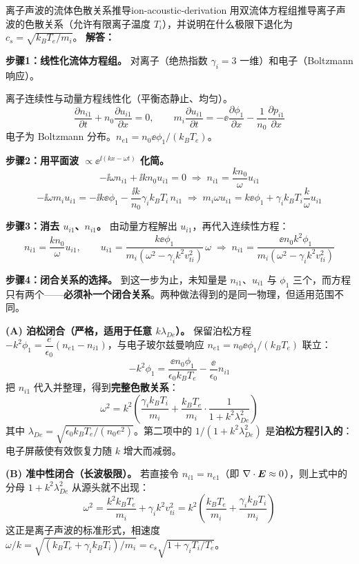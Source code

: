 \begin{example}{离子声波的流体色散关系推导}{ion-acoustic-derivation}
用双流体方程组推导离子声波的色散关系（允许有限离子温度 $T_i$），并说明在什么极限下退化为 $c_s = \sqrt{k_{\!B}T_e/m_i}$。
\tcblower
\textbf{解答：}

\textbf{步骤1：线性化流体方程组。} 对离子（绝热指数 $\gamma_i = 3$ 一维）和电子（Boltzmann 响应）。

离子连续性与动量方程线性化（平衡态静止、均匀）。
\[
\frac{\partial n_{i1}}{\partial t} + n_0\frac{\partial u_{i1}}{\partial x} = 0, \qquad
m_i\frac{\partial u_{i1}}{\partial t} = -\ee\frac{\partial\phi_1}{\partial x} - \frac{1}{n_0}\frac{\partial p_{i1}}{\partial x}
\]
电子为 Boltzmann 分布。$n_{e1} = n_0\ee\phi_1/(k_{\!B}T_e)$。

\textbf{步骤2：用平面波 $\propto\ee^{\ii(kx-\omega t)}$ 化简。}
\[
-\ii\omega n_{i1} + \ii k n_0 u_{i1} = 0 \;\Rightarrow\; n_{i1} = \frac{k n_0}{\omega}u_{i1}
\]
\[
-\ii\omega m_i u_{i1} = -\ii k \ee\phi_1 - \frac{\ii k}{n_0}\gamma_i k_{\!B}T_i\, n_{i1}
\;\Rightarrow\; m_i\omega u_{i1} = k\ee\phi_1 + \gamma_i k_{\!B}T_i\frac{k}{\omega}u_{i1}
\]

\textbf{步骤3：消去 $u_{i1}$、$n_{i1}$。} 由动量方程解出 $u_{i1}$，再代入连续性方程：
\[
n_{i1} = \frac{k n_0}{\omega}u_{i1}, \qquad
u_{i1} = \frac{k\ee\phi_1}{m_i(\omega^2 - \gamma_i k^2 v_{ti}^2)}\,\omega
\;\Longrightarrow\;
n_{i1} = \frac{\ee n_0 k^2\phi_1}{m_i(\omega^2 - \gamma_i k^2 v_{ti}^2)}
\]

\textbf{步骤4：闭合关系的选择。} 到这一步为止，未知量是 $n_{i1}$、$u_{i1}$ 与 $\phi_1$ 三个，而方程只有两个——\textbf{必须补一个闭合关系}。两种做法得到的是同一物理，但适用范围不同。

\smallskip
\textbf{(A) 泊松闭合（严格，适用于任意 $k\lambda_{De}$）。} 保留泊松方程 $-k^2\phi_1 = \dfrac{e}{\epsilon_0}(n_{e1}-n_{i1})$，与电子玻尔兹曼响应 $n_{e1}=n_0\ee\phi_1/(k_{\!B}T_e)$ 联立：
\[
-k^2\phi_1 = \frac{\ee n_0\phi_1}{\epsilon_0 k_{\!B}T_e} - \frac{\ee}{\epsilon_0}n_{i1}
\]
把 $n_{i1}$ 代入并整理，得到\textbf{完整色散关系}：
\[
\boxed{\;\omega^2 = k^2\left(\frac{\gamma_i k_{\!B}T_i}{m_i} + \frac{k_{\!B}T_e}{m_i}\cdot\frac{1}{1+k^2\lambda_{De}^2}\right)\;}
\]
其中 $\lambda_{De}=\sqrt{\epsilon_0 k_{\!B}T_e/(n_0e^2)}$。第二项中的 $1/(1+k^2\lambda_{De}^2)$ 是\textbf{泊松方程引入的}：电子屏蔽使有效恢复力随 $k$ 增大而减弱。

\smallskip
\textbf{(B) 准中性闭合（长波极限）。} 若直接令 $n_{i1}=n_{e1}$（即 $\nabla\cdot\bm{E}\approx0$），则上式中的分母 $1+k^2\lambda_{De}^2$ 从源头就不出现：
\[
\omega^2 = \frac{k^2 k_{\!B}T_e}{m_i} + \gamma_i k^2 v_{ti}^2
= k^2\left(\frac{k_{\!B}T_e}{m_i} + \frac{\gamma_i k_{\!B}T_i}{m_i}\right)
\]
这正是离子声波的标准形式，相速度 $\omega/k=\sqrt{(k_{\!B}T_e+\gamma_i k_{\!B}T_i)/m_i}=c_s\sqrt{1+\gamma_i T_i/T_e}$。


\end{example}
